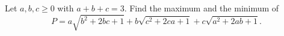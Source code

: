 Let $a,b,c\ge0$ with $a+b+c=3$. Find the maximum and the minimum of
\[
P=a\sqrt{b^2+2bc+1}+b\sqrt{c^2+2ca+1}+c\sqrt{a^2+2ab+1}.
\]
